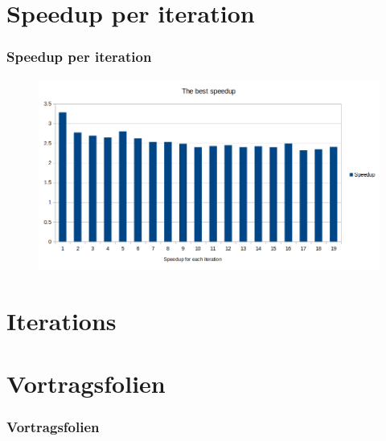\documentclass[
	10pt,
	t		%
]{beamer}
\begin{document}
\section{Speedup per iteration}
\begin{frame}
\frametitle{Speedup per iteration}
\begin{figure}[ht]
\centering
\includegraphics[width=1\textwidth]{chart2}
\end{figure}
\end{frame}

\section{Iterations}
\begin{frame}
\begin{center}
\end{center}
\end{frame}

\section{Vortragsfolien}
\begin{frame}
\frametitle{Vortragsfolien}
\end{frame}
\end{document}
